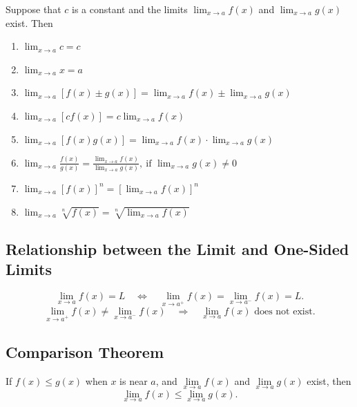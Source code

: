 \documentclass[a4paper,11pt]{article}
\theoremstyle{definition}
\theoremstyle{plain}
\theoremstyle{remark}
\begin{document}
\begin{tcolorbox}
    Suppose that \(c\) is a constant and the limits \(\displaystyle \lim_{x \to a} f(x)\) and \(\displaystyle \lim_{x \to a} g(x)\) exist. Then
    \begin{enumerate}
        \item \(\displaystyle \lim_{x \to a} c = c\)
        \item \(\displaystyle \lim_{x \to a} x = a\)
        \item \(\displaystyle \lim_{x \to a} [f(x) \pm g(x)] = \lim_{x \to a} f(x) \pm \lim_{x \to a} g(x)\)
        \item \(\displaystyle \lim_{x \to a} [c f(x)] = c \lim_{x \to a} f(x)\)
        \item \(\displaystyle \lim_{x \to a} [f(x) g(x)] = \lim_{x \to a} f(x) \cdot \lim_{x \to a} g(x)\)
        \item \(\displaystyle \lim_{x \to a} \frac{f(x)}{g(x)} = \frac{\displaystyle \lim_{x \to a} f(x)}{\displaystyle \lim_{x \to a} g(x)},\ \text{if } \lim_{x \to a} g(x) \neq 0\)
        \item \(\displaystyle \lim_{x \to a} [f(x)]^n = [\lim_{x \to a} f(x)]^n\)
        \item \(\displaystyle \lim_{x \to a} \sqrt[n]{f(x)} = \sqrt[n]{\lim_{x \to a} f(x)}\)
    \end{enumerate}
\end{tcolorbox}




\subsection{Relationship between the Limit and One-Sided Limits}

\begin{tcolorbox}
    \[\lim_{x \to a} f(x) = L \quad \Leftrightarrow \quad \lim_{x \to a^+} f(x) = \lim_{x \to a^-} f(x) = L.\]
    \[\lim_{x \to a^+} f(x) \neq \lim_{x \to a^-} f(x) \quad \Rightarrow \quad \lim_{x \to a} f(x) \text{ does not exist}.\]
\end{tcolorbox}




\subsection{Comparison Theorem}

\begin{tcolorbox}
    If \( f(x) \leq g(x) \) when \( x \) is near \( a \), and \(\lim\limits_{x \to a} f(x)\) and \(\lim\limits_{x \to a} g(x)\) exist, then \[\lim\limits_{x \to a} f(x) \leq \lim\limits_{x \to a} g(x).\]
\end{tcolorbox}
\end{document}
